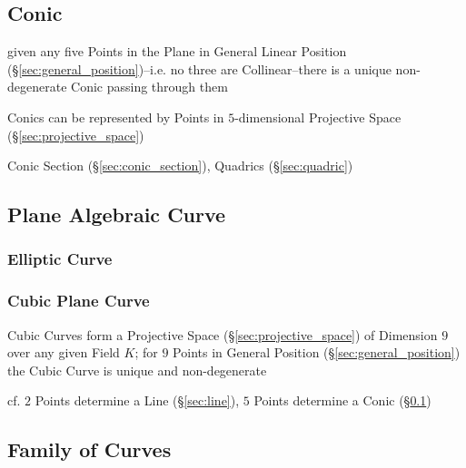 \subsection{Conic}\label{sec:conic}

given any five Points in the Plane in General Linear Position
(\S\ref{sec:general_position})--i.e. no three are Collinear--there is a unique
non-degenerate Conic passing through them

Conics can be represented by Points in $5$-dimensional Projective Space
(\S\ref{sec:projective_space})

\fist Conic Section (\S\ref{sec:conic_section}), Quadrics (\S\ref{sec:quadric})



\subsection{Plane Algebraic Curve}\label{sec:plane_algebraic_curve}

\subsubsection{Elliptic Curve}\label{sec:elliptic_curve}

\subsubsection{Cubic Plane Curve}\label{sec:cubic_plane_curve}

Cubic Curves form a Projective Space (\S\ref{sec:projective_space}) of
Dimension $9$ over any given Field $K$; for $9$ Points in General Position
(\S\ref{sec:general_position}) the Cubic Curve is unique and non-degenerate

cf. $2$ Points determine a Line (\S\ref{sec:line}), $5$ Points determine a Conic
(\S\ref{sec:conic})



\subsection{Family of Curves}\label{sec:curve_family}

